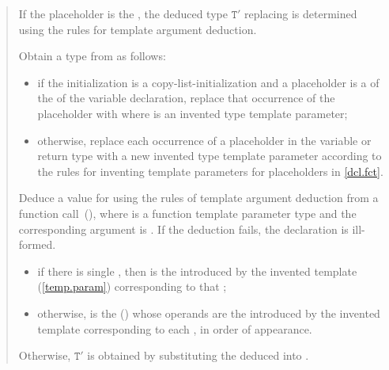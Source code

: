 \begin{quote}
\setcounter{Paras}{3}
\pnum
If the placeholder is the  
, the deduced type
$\mathtt{T}'$ replacing  is determined using the rules for template 
argument deduction.
% 
%
\begin{addedblock}
Obtain a type  from  as follows:
\begin{itemize}
\item if the initialization is a copy-list-initialization
and a placeholder is a  of the 
 of the variable declaration, replace that 
occurrence of the placeholder with 
where  is an invented type template parameter;

\item otherwise, replace each occurrence of a placeholder in the
variable or return type with a new invented type template parameter
according to the rules for inventing template parameters
for placeholders in \ref{dcl.fct}. 
\end{itemize}
\end{addedblock}
%
Deduce a value for  
 using the rules
of template argument deduction from a function 
call~(),
where  is a
function template parameter type and
the corresponding argument is .
% 
If the deduction fails, the declaration is ill-formed.
% 
\begin{addedblock}
\begin{itemize}
\item if there is single ,
then  is the  introduced
by the invented template  (\ref{temp.param})
corresponding to that ;
\item otherwise,  is the 
() whose operands are the 
 introduced by the invented
template  corresponding to
each , in order of appearance.
\end{itemize}
\end{addedblock}
% 
%
Otherwise, $\mathtt{T}'$ is obtained by
substituting the deduced 
into .


\end{quote}
